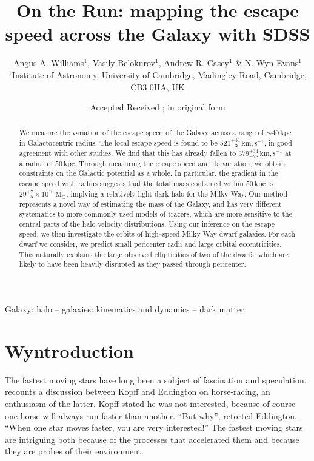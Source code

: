 \documentclass[useAMS,twocolumn,usenatbib]{mn2e}
\title[Fast moving stars in SDSS] {On the Run: mapping the escape speed across the Galaxy with SDSS}
\author[Williams, Belokurov, Casey \& Evans]{Angus A. Williams$^1$,
  Vasily Belokurov$^1$, Andrew R. Casey$^1$ \& N. Wyn Evans$^1$
  \medskip
  \\$^1$Institute of Astronomy, University of Cambridge, Madingley Road, Cambridge, CB3 0HA, UK}
\def\kpc{{\,\mathrm{kpc}}}
\def\km,s{{\,\mathrm{km,s^{-1}}}}
\def\Msun{{\,\mathrm{M}_\odot}}
\begin{document}
\date{Accepted  Received ; in original form }

\pagerange{\pageref{firstpage}--\pageref{lastpage}} 

\maketitle

\label{firstpage}

\begin{abstract}
We measure the variation of the escape speed of the Galaxy across a range of $\sim 40\kpc$ in Galactocentric radius. 
The local escape speed is found to be $521^{+46}_{-30}\km,s$, in good agreement with other studies. 
We find that this has already fallen to $379^{+34}_{-28}\km,s$ at a radius of $50\kpc$. 
Through measuring the escape speed and its variation, we obtain constraints on the Galactic potential as a whole. 
In particular, the gradient in the escape speed with radius suggests that the total mass contained within $50\kpc$ is $29^{+7}_{-5}\times10^{10}\Msun$, implying a relatively light dark halo for the Milky Way. 
Our method represents a novel way of estimating the mass of the Galaxy, and has very different systematics to more commonly used models of tracers, which are more sensitive to the central parts of the halo velocity distributions. 
Using our inference on the escape speed, we then investigate the orbits of high--speed Milky Way dwarf galaxies. 
For each dwarf we consider, we predict small pericenter radii and large orbital eccentricities. 
This naturally explains the large observed ellipticities of two of the dwarfs, which are likely to have been heavily disrupted as they passed through pericenter.
\end{abstract}

\begin{keywords}
Galaxy: halo -- galaxies: kinematics and dynamics -- dark matter
\end{keywords}

\section{Wyntroduction}

The fastest moving stars have long been a subject of fascination and speculation. 
\citet{Vi56} recounts a discussion between Kopff and Eddington on horse-racing, an enthusiasm of the latter. 
Kopff stated he was not interested, because of course one horse will always run faster than another.  
``But why'', retorted Eddington. ``When one star moves faster, you are very interested!'' 
The fastest moving stars are intriguing both because of the processes that accelerated them and because they are probes of their environment.
\end{document}
